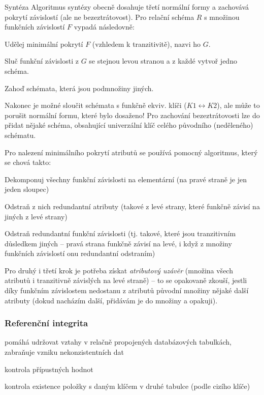 \begin{algoritmusN}{Syntéza}
Algoritmus syntézy obecně dosahuje třetí normální formy a zachovává pokrytí závislostí (ale ne bezeztrátovost). Pro relační schéma $R$ s množinou funkčních závislostí $F$ vypadá následovně:
\begin{penumerate}
    \item Udělej minimální pokrytí $F$ (vzhledem k tranzitivitě), nazvi ho $G$.
    \item Sluč funkční závislosti z $G$ se stejnou levou stranou a z každé vytvoř jedno schéma. 
    \item Zahoď schémata, která jsou podmnožiny jiných.
\end{penumerate}
Nakonec je možné sloučit schémata s funkčně ekviv. klíči ($K1 \leftrightarrow K2$), ale může to porušit normální formu, které bylo dosaženo! Pro zachování bezeztrátovosti lze do přidat nějaké schéma, obsahující univerzální klíč celého původního (neděleného) schématu.
\end{algoritmusN}

\begin{poznamka}
Pro nalezení minimálního pokrytí atributů se používá pomocný algoritmus, který se chová takto:
\begin{penumerate} 
    \item Dekomponuj všechny funkční závislosti na elementární (na pravé straně je jen jeden sloupec)
    \item Odstraň z nich redundantní atributy (takové z levé strany, které funkčně závisí na jiných z levé strany)
    \item Odstraň redundantní funkční závislosti (tj. takové, které jsou tranzitivním důsledkem jiných -- pravá strana funkčně závisí na levé, i když z množiny funkčních závislostí onu redundantní odstraním)
\end{penumerate}
Pro druhý i třetí krok je potřeba získat \emph{atributový uzávěr} (množina všech atributů i tranzitivně závislých na levé straně) -- to se opakovaně zkouší, jestli díky funkčním závislostem nedostanu z atributů původní množiny nějaké další atributy (dokud nacházím další, přidávám je do množiny a opakuji).
\end{poznamka}

\subsubsection*{Referenční integrita}

\begin{pitemize}
	\item pomáhá udržovat vztahy v relačně propojených databázových tabulkách, zabraňuje vzniku nekonzistentních dat
	\item kontrola přípustných hodnot
	\item kontrola existence položky s daným klíčem v druhé tabulce (podle cizího klíče) 
\end{pitemize}

